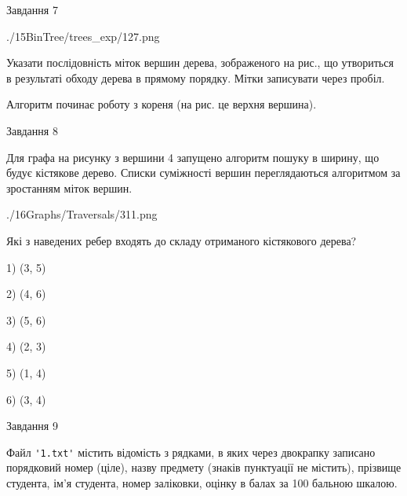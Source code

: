 \documentclass[12pt, ukrainian]{article}
\def\code#1{\Verb!#1!}
\begin{document}
{\vspace{10mm}\par

\newpage
\begin{minipage}[t]{9.7cm}
               
{\begin{center}Завдання {7}\end{center}}
\vspace{-6mm}

\begin{center}
	{./15BinTree/trees_exp/127.png}
\end{center}
Указати послідовність міток вершин дерева, зображеного на рис., що утвориться в результаті обходу дерева в прямому порядку. Мітки записувати через пробіл.\par Алгоритм починає роботу з кореня (на рис. це верхня вершина).\par

\end{minipage}
\vline \hspace{8mm}
\begin{minipage}[t]{8.0cm}
               
{\begin{center}Завдання {8}\end{center}}
\vspace{-6mm}
Для графа на рисунку з вершини 4 запущено алгоритм пошуку в ширину, що будує кістякове дерево. Списки суміжності вершин переглядаються алгоритмом за зростанням міток вершин.\par
\begin{center}
	{./16Graphs/Traversals/311.png}
\end{center}
\par Які з наведених ребер входять до складу отриманого кістякового дерева?\par
1) (3, 5)\par
2) (4, 6)\par
3) (5, 6)\par
4) (2, 3)\par
5) (1, 4)\par
6) (3, 4)\par
{\vskip 15pt} \par

\end{minipage}

               
{\begin{center}Завдання {9}\end{center}}
\vspace{-6mm}
Файл \code{'1.txt'} містить відомість з рядками, в яких через двокрапку записано поряд\-ковий номер (ціле), назву предмету (знаків пунктуації не містить), прізвище студента, ім'я студента, номер заліковки, оцінку в балах за 100 бальною шкалою.

}
\end{document}
